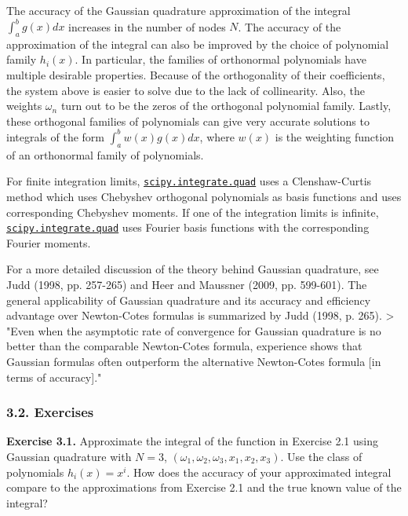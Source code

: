 \documentclass[11pt]{article}
\begin{document}
The accuracy of the Gaussian quadrature approximation of the integral
\(\int_a^b g(x)dx\) increases in the number of nodes \(N\). The accuracy
of the approximation of the integral can also be improved by the choice
of polynomial family \(h_i(x)\). In particular, the families of
orthonormal polynomials have multiple desirable properties. Because of
the orthogonality of their coefficients, the system above is easier to
solve due to the lack of collinearity. Also, the weights \(\omega_n\)
turn out to be the zeros of the orthogonal polynomial family. Lastly,
these orthogonal families of polynomials can give very accurate
solutions to integrals of the form \(\int_a^b w(x)g(x)dx\), where
\(w(x)\) is the weighting function of an orthonormal family of
polynomials.

For finite integration limits,
\href{http://docs.scipy.org/doc/scipy/reference/generated/scipy.integrate.quad.html\#scipy.integrate.quad}{\texttt{scipy.integrate.quad}}
uses a Clenshaw-Curtis method which uses Chebyshev orthogonal
polynomials as basis functions and uses corresponding Chebyshev moments.
If one of the integration limits is infinite,
\href{http://docs.scipy.org/doc/scipy/reference/generated/scipy.integrate.quad.html\#scipy.integrate.quad}{\texttt{scipy.integrate.quad}}
uses Fourier basis functions with the corresponding Fourier moments.

For a more detailed discussion of the theory behind Gaussian quadrature,
see Judd (1998, pp. 257-265) and Heer and Maussner (2009, pp. 599-601).
The general applicability of Gaussian quadrature and its accuracy and
efficiency advantage over Newton-Cotes formulas is summarized by Judd
(1998, p. 265). \textgreater{} "Even when the asymptotic rate of
convergence for Gaussian quadrature is no better than the comparable
Newton-Cotes formula, experience shows that Gaussian formulas often
outperform the alternative Newton-Cotes formula {[}in terms of
accuracy{]}."

    \subsubsection{3.2. Exercises}\label{exercises}

    \textbf{Exercise 3.1.} Approximate the integral of the function in
Exercise 2.1 using Gaussian quadrature with \(N=3\),
\((\omega_1,\omega_2,\omega_3,x_1,x_2,x_3)\). Use the class of
polynomials \(h_i(x)=x^i\). How does the accuracy of your approximated
integral compare to the approximations from Exercise 2.1 and the true
known value of the integral?
\end{document}
